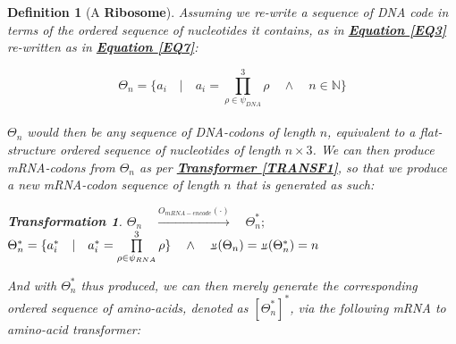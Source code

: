 \documentclass[a4paper, 18pt]{book} %
\newtheorem{defn}{Definition}
\newtheorem{trans}{Transformation}
\newcommand{\invpi}{\rotatebox[origin=c]{180}{$\pi$}}
\begin{document}
\begin{defn}[A \textbf{Ribosome}]
\label{DEFRIBOSOME}
Assuming we re-write a sequence of DNA code in terms of the ordered sequence of nucleotides it contains, as in \textbf{\hyperref[EQ3]{Equation \ref{EQ3}}} re-written as in \textbf{\hyperref[EQ7]{Equation \ref{EQ7}}}:

 \begin{equation}
\label{EQ7}
\Theta_n = \{a_i \quad | \quad a_i = \prod\limits_{\rho \in \psi_{DNA}}^3 \rho \quad \land \quad n \in \mathbb{N} \}
\end{equation}\\

$\Theta_n$ would then be any sequence of DNA-codons of length $n$, equivalent to a flat-structure ordered sequence of nucleotides of length $n \times 3$. We can then produce mRNA-codons from $\Theta_n$ as per \textbf{\hyperref[TRANSF1]{Transformer \ref{TRANSF1}}}, so that we produce a new mRNA-codon sequence of length $n$ that is generated as such:

\begin{trans}
\label{TRANS1}
$\Theta_n \quad \xrightarrow{O_{mRNA-encode}(\cdot)} \quad \Theta^*_n;$\\
$\Theta^*_n = \{a_i^* \quad | \quad a_i^* = \prod\limits_{\rho \in \psi_{RNA}}^3 \rho \} \quad \land \quad \invpi(\Theta_n) = \invpi(\Theta^*_n) = n$
\end{trans}

And with $\Theta^*_n$ thus produced, we can then merely generate the corresponding ordered sequence of amino-acids, denoted as $[\Theta^*_n]^*$, via the following mRNA to amino-acid transformer: 


\end{defn}
\end{document}
